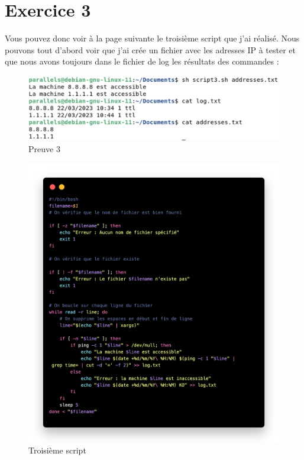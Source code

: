 \documentclass[12pt, a4paper]{article}
\begin{document}
\section{Exercice 3}
Vous pouvez donc voir à la page suivante le troisième script que j'ai réalisé.
Nous pouvons tout d'abord voir que j'ai crée un fichier avec les adresses IP à tester 
et que nous avons toujours dans le fichier de log les résultats des commandes :\\ 

\begin{figure}[h]
    \centering
    \includegraphics[width=1\textwidth]{img/preuve3.png}
    \caption{Preuve 3}
    \label{fig:script6}
\end{figure}

\begin{figure}[h]
    \centering
    \includegraphics[width=1\textwidth]{img/code3.png}
    \caption{Troisième script}
    \label{fig:script7}
\end{figure}
\end{document}
